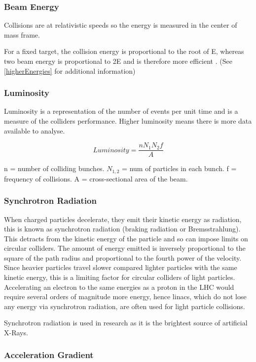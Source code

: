  \subsubsection{Beam Energy}
 
 Collisions are at relativistic speeds so the energy is measured in the center of mass frame.
 
 For a fixed target, the collision energy is proportional to the root of E, whereas two beam energy is proportional to 2E and is therefore more efficient \cite{ITP:Energy}. (See \ref{higherEnergies} for additional information)
 
 \subsubsection{Luminosity}
 
 Luminosity is a representation of the number of events per unit time and is a measure of the colliders performance. Higher luminosity means there is more data available to analyse.
 
 $$
 Luminosity = \frac{n N_1 N_2 f}{A}
 $$
 
 n = number of colliding bunches. $N_{1,2}$ = num of particles in each bunch. f = frequency of collisions. A = cross-sectional area of the beam.
 
 \subsubsection{Synchrotron Radiation}
 
 When charged particles decelerate, they emit their kinetic energy as radiation, this is known as synchrotron radiation (braking radiation or Bremsstrahlung). 
 This detracts from the kinetic energy of the particle and so can impose limits on circular colliders. 
 The amount of energy emitted is inversely proportional to the square of the path radius and proportional to the fourth power of the velocity.  
 Since heavier particles travel slower compared lighter particles with the same kinetic energy, this is a limiting factor for circular colliders of light particles. Accelerating an electron to the same energies as a proton in the LHC would require several orders of magnitude more energy, hence linacs, which do not lose any energy via synchrotron radiation, are often used for light particle collisions.
 
 Synchrotron radiation is used in research as it is the brightest source of artificial X-Rays.
 
 \subsubsection{Acceleration Gradient}
 

